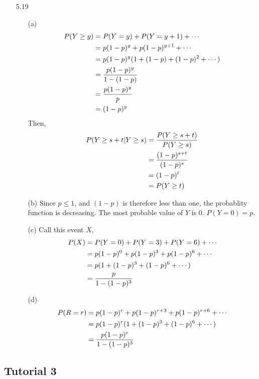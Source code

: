 \documentclass[english, 11pt]{article}
\begin{document}
\begin{itemize}
    \item[5.19]
    \begin{itemize}
      \item[(a)] \begin{align*}
        P(Y \geq y) & = P(Y = y) + P(Y = y + 1) + \cdots \\
        & = p(1-p)^y + p(1-p)^{y+1} + \cdots \\
        & = p(1-p)^{y}(1 + (1-p) + (1-p)^2 + \cdots) \\
        & = \frac{p(1-p)^y}{1 - (1-p)} \\
        & = \frac{p(1-p)^y}{p} \\
        & = (1-p)^y
      \end{align*}
      Then,
      \begin{align*}
        P(Y \geq s + t | Y \geq s) & = \frac{P(Y \geq s + t)}{P(Y \geq s)} \\
        & = \frac{(1-p)^{s+t}}{(1-p)^{s}} \\
        & = (1-p)^t \\
        & = P(Y \geq t)
      \end{align*}
      \item[(b)] Since $p \leq 1$, and $(1-p)$ is therefore less than one, the probablity function is decreasing. The most probable value of $Y$ is 0. $P(Y = 0) = p$.
      \item[(c)] Call this event $X$,
      \begin{align*}
        P(X) & = P(Y = 0) + P(Y = 3) + P(Y = 6) + \cdots \\
        & = p(1-p)^0 + p(1-p)^3 + p(1-p)^6 + \cdots \\
        & = p( 1 + (1-p)^3 + (1-p)^6 + \cdots)\\
        & = \frac{p}{1 - (1-p)^3}
      \end{align*}
      \item[(d)]
      \begin{align*}
        P(R = r) & = p(1-p)^r + p(1-p)^{r + 3} + p(1-p)^{r+6} + \cdots \\
        & = p(1-p)^r(1 + (1-p)^3 + (1-p)^6 + \cdots) \\
        & = \frac{p(1-p)^r}{1 - (1-p)^3}
      \end{align*}
    \end{itemize}
  \end{itemize}

  \subsection{Tutorial 3}
\end{document}
